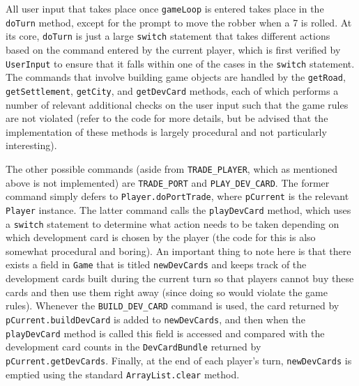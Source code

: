 \documentclass[pageno]{jpaper}
\begin{document}
\begin{doublespacing}
All user input that takes place once \lstinline$gameLoop$ is entered takes place in the \lstinline$doTurn$ method, except for the prompt to move the robber when a 7 is rolled. At its core, \lstinline$doTurn$ is just a large \lstinline$switch$ statement that takes different actions based on the command entered by the current player, which is first verified by \lstinline$UserInput$ to ensure that it falls within one of the cases in the \lstinline$switch$ statement. The commands that involve building game objects are handled by the \lstinline$getRoad$, \lstinline$getSettlement$, \lstinline$getCity$, and \lstinline$getDevCard$ methods, each of which performs a number of relevant additional checks on the user input such that the game rules are not violated (refer to the code for more details, but be advised that the implementation of these methods is largely procedural and not particularly interesting). 

The other possible commands (aside from \lstinline$TRADE_PLAYER$, which as mentioned above is not implemented) are \lstinline$TRADE_PORT$ and \lstinline$PLAY_DEV_CARD$. The former command simply defers to \lstinline$Player.doPortTrade$, where \lstinline$pCurrent$ is the relevant \lstinline$Player$ instance. The latter command calls the \lstinline$playDevCard$ method, which uses a \lstinline$switch$ statement to determine what action needs to be taken depending on which development card is chosen by the player (the code for this is also somewhat procedural and boring). An important thing to note here is that there exists a field in \lstinline$Game$ that is titled \lstinline$newDevCards$ and keeps track of the development cards built during the current turn so that players cannot buy these cards and then use them right away (since doing so would violate the game rules). Whenever the \lstinline$BUILD_DEV_CARD$ command is used, the card returned by \lstinline$pCurrent.buildDevCard$ is added to \lstinline$newDevCards$, and then when the \lstinline$playDevCard$ method is called this field is accessed and compared with the development card counts in the \lstinline$DevCardBundle$ returned by \lstinline$pCurrent.getDevCards$. Finally, at the end of each player's turn, \lstinline$newDevCards$ is emptied using the standard \lstinline$ArrayList.clear$ method.


\end{doublespacing}
\end{document}
